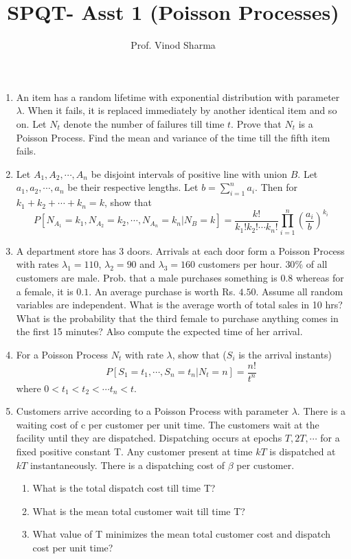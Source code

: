 \documentclass[a4paper,10pt]{article}
\title{SPQT- Asst 1 (Poisson Processes)}
\author{Prof. Vinod Sharma}
\begin{document}
\maketitle
\begin{enumerate}
	\item An item has a random lifetime with exponential distribution with parameter $\lambda$. When it fails, it is replaced immediately by another identical item and so on. Let $N_t$ denote the number of failures till time $t$. Prove that $N_t$ is a Poisson Process. Find the mean and variance of the time till the fifth item fails.
	\item Let $A_1,A_2, \cdots, A_n$ be disjoint intervals of positive line with union $B$. Let $a_1,a_2, \cdots, a_n$ be their respective lengths. Let $b=\sum_{i=1}^n a_i$. Then for $k_1 + k_2+\cdots + k_n = k$, show that
\[ P\left[ N_{A_1} = k_1, N_{A_2} = k_2, \cdots, N_{A_n} = k_n | N_B = k\right] = \frac{k!}{k_1! k_2!\cdots k_n!} \prod_{i=1}^n\left(\frac{a_i}{b}\right)^{k_i}\]

\item A department store has 3 doors. Arrivals at each door form a Poisson Process with rates $\lambda_1 = 110$, $\lambda_2 = 90$ and $\lambda_3 = 160$ customers per hour. $30\%$ of all customers are male. Prob. that a male purchases something is $0.8$ whereas for a female, it is $0.1$. An average purchase is worth Rs. $4.50$. Assume all random variables are independent. What is the average worth of total sales in 10 hrs? What is the probability that the third female to purchase anything comes in the first 15 minutes? Also compute the expected time of her arrival.

\item For a Poisson Process $N_t$ with rate $\lambda$, show that ($S_i$ is the arrival instants) 
\[ P\left[S_1=t_1, \cdots, S_n=t_n | N_t = n\right] = \frac{n!}{t^n}\]
where $0 < t_1 < t_2 < \cdots t_n < t$.

\item Customers arrive according to a Poisson Process with parameter $\lambda$. There is a waiting cost of c per customer per unit time. The customers wait at the facility until they are dispatched. Dispatching occurs at epochs $T, 2T, \cdots$ for a fixed positive constant T. Any customer present at time $kT$ is dispatched at $kT$ instantaneously. There is a dispatching cost of $\beta$ per customer. 
\begin{enumerate}
	\item What is the total dispatch cost till time T?
	\item What is the mean total customer wait till time T?
	\item What value of T minimizes the mean total customer cost and dispatch cost per unit time?
	\end{enumerate}


\end{enumerate}
\end{document}
